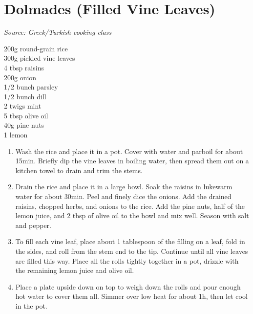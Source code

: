\documentclass{report}
\begin{document}
\section{Dolmades (Filled Vine Leaves)}
\textit{Source: Greek/Turkish cooking class}\\
\begin{minipage}[t]{0.21\textwidth} \vspace{0pt} 
200g round-grain rice\\
300g pickled vine leaves\\
4 tbsp raisins\\
200g onion\\
1/2 bunch parsley\\
1/2 bunch dill\\
2 twigs mint\\
5 tbsp olive oil\\
40g pine nuts\\
1 lemon\\
\end{minipage}
\hfill
\begin{minipage}[t]{0.78\textwidth} \vspace{0pt}
	\begin{enumerate}
		\item Wash the rice and place it in a pot. Cover with water and parboil for about 15min. Briefly dip the vine leaves in boiling water, then spread them out on a kitchen towel to drain and trim the stems.
        \item Drain the rice and place it in a large bowl. Soak the raisins in lukewarm water for about 30min. Peel and finely dice the onions. Add the drained raisins, chopped herbs, and onions to the rice. Add the pine nuts, half of the lemon juice, and 2 tbsp of olive oil to the bowl and mix well. Season with salt and pepper.
        \item To fill each vine leaf, place about 1 tablespoon of the filling on a leaf, fold in the sides, and roll from the stem end to the tip. Continue until all vine leaves are filled this way. Place all the rolls tightly together in a pot, drizzle with the remaining lemon juice and olive oil.
        \item Place a plate upside down on top to weigh down the rolls and pour enough hot water to cover them all. Simmer over low heat for about 1h, then let cool in the pot.    
	\end{enumerate}	
\end{minipage}
\end{document}
